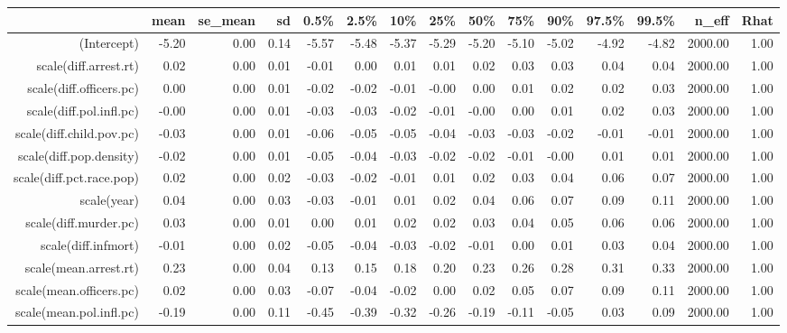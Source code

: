\begin{table}[ht]
\centering
\begin{tabular}{rrrrrrrrrrrrrrr}
  \hline
 & mean & se\_mean & sd & 0.5\% & 2.5\% & 10\% & 25\% & 50\% & 75\% & 90\% & 97.5\% & 99.5\% & n\_eff & Rhat \\ 
  \hline
(Intercept) & -5.20 & 0.00 & 0.14 & -5.57 & -5.48 & -5.37 & -5.29 & -5.20 & -5.10 & -5.02 & -4.92 & -4.82 & 2000.00 & 1.00 \\ 
  scale(diff.arrest.rt) & 0.02 & 0.00 & 0.01 & -0.01 & 0.00 & 0.01 & 0.01 & 0.02 & 0.03 & 0.03 & 0.04 & 0.04 & 2000.00 & 1.00 \\ 
  scale(diff.officers.pc) & 0.00 & 0.00 & 0.01 & -0.02 & -0.02 & -0.01 & -0.00 & 0.00 & 0.01 & 0.02 & 0.02 & 0.03 & 2000.00 & 1.00 \\ 
  scale(diff.pol.infl.pc) & -0.00 & 0.00 & 0.01 & -0.03 & -0.03 & -0.02 & -0.01 & -0.00 & 0.00 & 0.01 & 0.02 & 0.03 & 2000.00 & 1.00 \\ 
  scale(diff.child.pov.pc) & -0.03 & 0.00 & 0.01 & -0.06 & -0.05 & -0.05 & -0.04 & -0.03 & -0.03 & -0.02 & -0.01 & -0.01 & 2000.00 & 1.00 \\ 
  scale(diff.pop.density) & -0.02 & 0.00 & 0.01 & -0.05 & -0.04 & -0.03 & -0.02 & -0.02 & -0.01 & -0.00 & 0.01 & 0.01 & 2000.00 & 1.00 \\ 
  scale(diff.pct.race.pop) & 0.02 & 0.00 & 0.02 & -0.03 & -0.02 & -0.01 & 0.01 & 0.02 & 0.03 & 0.04 & 0.06 & 0.07 & 2000.00 & 1.00 \\ 
  scale(year) & 0.04 & 0.00 & 0.03 & -0.03 & -0.01 & 0.01 & 0.02 & 0.04 & 0.06 & 0.07 & 0.09 & 0.11 & 2000.00 & 1.00 \\ 
  scale(diff.murder.pc) & 0.03 & 0.00 & 0.01 & 0.00 & 0.01 & 0.02 & 0.02 & 0.03 & 0.04 & 0.05 & 0.06 & 0.06 & 2000.00 & 1.00 \\ 
  scale(diff.infmort) & -0.01 & 0.00 & 0.02 & -0.05 & -0.04 & -0.03 & -0.02 & -0.01 & 0.00 & 0.01 & 0.03 & 0.04 & 2000.00 & 1.00 \\ 
  scale(mean.arrest.rt) & 0.23 & 0.00 & 0.04 & 0.13 & 0.15 & 0.18 & 0.20 & 0.23 & 0.26 & 0.28 & 0.31 & 0.33 & 2000.00 & 1.00 \\ 
  scale(mean.officers.pc) & 0.02 & 0.00 & 0.03 & -0.07 & -0.04 & -0.02 & 0.00 & 0.02 & 0.05 & 0.07 & 0.09 & 0.11 & 2000.00 & 1.00 \\ 
  scale(mean.pol.infl.pc) & -0.19 & 0.00 & 0.11 & -0.45 & -0.39 & -0.32 & -0.26 & -0.19 & -0.11 & -0.05 & 0.03 & 0.09 & 2000.00 & 1.00 \\ 

\end{tabular}
\end{table}
